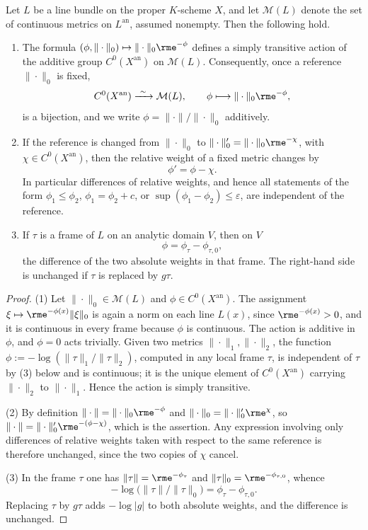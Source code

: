 \begin{proposition}
\label{prop:metrics-torsor}
Let $L$ be a line bundle on the proper $K$-scheme $X$, and let
$\mathcal M(L)$ denote the set of continuous metrics on
$L^{\mathrm{an}}$, assumed nonempty. Then the following hold.
\begin{enumerate}
\item The formula
$(\phi,\|\cdot\|_0)\mapsto\|\cdot\|_0\rme^{-\phi}$ defines a simply
transitive action of the additive group $C^0(X^{\mathrm{an}})$ on
$\mathcal M(L)$. Consequently, once a reference $\|\cdot\|_0$ is fixed,
\[
 C^0(X^{\mathrm{an}})\xrightarrow{\ \sim\ }\mathcal M(L),
 \qquad
 \phi\longmapsto\|\cdot\|_0\rme^{-\phi},
\]
is a bijection, and we write $\phi=\|\cdot\|/\|\cdot\|_0$ additively.
\item If the reference is changed from
$\|\cdot\|_0$ to $\|\cdot\|_0'=\|\cdot\|_0\rme^{-\chi}$, with
$\chi\in C^0(X^{\mathrm{an}})$, then the relative weight of a fixed metric
changes by
\[
 \phi'=\phi-\chi .
\]
In particular differences of relative weights, and hence all statements of
the form $\phi_1\le\phi_2$, $\phi_1=\phi_2+c$, or
$\sup(\phi_1-\phi_2)\le\varepsilon$, are independent of the reference.
\item If $\tau$ is a frame of $L$ on an
analytic domain $V$, then on $V$
\[
 \phi=\phi_\tau-\phi_{\tau,0},
\]
the difference of the two absolute weights in that frame. The right-hand
side is unchanged if $\tau$ is replaced by $g\tau$.
\end{enumerate}
\end{proposition}

\begin{proof}
(1) Let $\|\cdot\|_0\in\mathcal M(L)$ and
$\phi\in C^0(X^{\mathrm{an}})$. The assignment
$\xi\mapsto\rme^{-\phi(x)}\|\xi\|_0$ is again a norm on each line
$L(x)$, since $\rme^{-\phi(x)}>0$, and it is continuous in every frame
because $\phi$ is continuous. The action is additive in $\phi$, and
$\phi=0$ acts trivially. Given two metrics $\|\cdot\|_1,\|\cdot\|_2$,
the function
$\phi:=-\log(\|\tau\|_1/\|\tau\|_2)$, computed in any local frame
$\tau$, is independent of $\tau$ by (3)
below and is continuous; it is the unique element of
$C^0(X^{\mathrm{an}})$ carrying $\|\cdot\|_2$ to $\|\cdot\|_1$. Hence
the action is simply transitive.

(2) By definition
$\|\cdot\|=\|\cdot\|_0\rme^{-\phi}$ and
$\|\cdot\|_0=\|\cdot\|_0'\rme^{\chi}$, so
$\|\cdot\|=\|\cdot\|_0'\rme^{-(\phi-\chi)}$, which is the assertion.
Any expression involving only differences of relative weights taken with
respect to the same reference is therefore unchanged, since the two copies
of $\chi$ cancel.

(3) In the frame $\tau$ one has
$\|\tau\|=\rme^{-\phi_\tau}$ and
$\|\tau\|_0=\rme^{-\phi_{\tau,0}}$, whence
\[
 -\log\bigl(\|\tau\|/\|\tau\|_0\bigr)=\phi_\tau-\phi_{\tau,0}.
\]
Replacing
$\tau$ by $g\tau$ adds $-\log|g|$ to both absolute weights, and the
difference is unchanged.
\end{proof}

